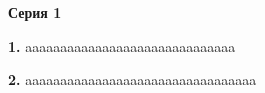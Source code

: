 \documentclass[12pt,a4paper]{article}
\def\q#1.{{\bf #1.}}
\theoremstyle{definition}
\begin{document}
\thispagestyle{firststyle}

\centerline{\bf Серия 1}


\q1. aaaaaaaaaaaaaaaaaaaaaaaaaaaaaa

\q2. aaaaaaaaaaaaaaaaaaaaaaaaaaaaaaaaa
\end{document}
